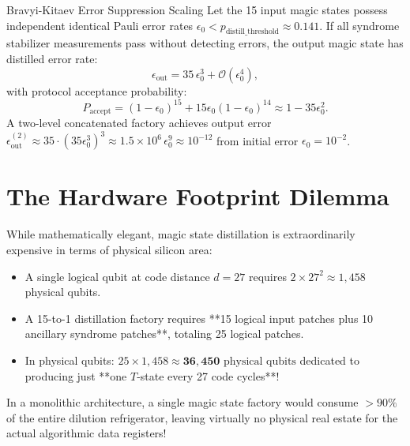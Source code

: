 \begin{theorembox}{Bravyi-Kitaev Error Suppression Scaling}
Let the 15 input magic states possess independent identical Pauli error rates $\epsilon_0 < p_{\text{distill\_threshold}} \approx 0.141$. If all syndrome stabilizer measurements pass without detecting errors, the output magic state has distilled error rate:
\begin{equation}
    \epsilon_{\text{out}} = 35 \, \epsilon_0^3 + \mathcal{O}(\epsilon_0^4),
    \label{eq:bravyi_kitaev_scaling}
\end{equation}
with protocol acceptance probability:
\begin{equation}
    P_{\text{accept}} = (1 - \epsilon_0)^{15} + 15 \epsilon_0 (1 - \epsilon_0)^{14} \approx 1 - 35 \epsilon_0^2.
    \label{eq:distill_paccept}
\end{equation}
A two-level concatenated factory achieves output error $\epsilon_{\text{out}}^{(2)} \approx 35 \cdot (35 \epsilon_0^3)^3 \approx 1.5 \times 10^6 \, \epsilon_0^9 \approx 10^{-12}$ from initial error $\epsilon_0 = 10^{-2}$.
\end{theorembox}

\section{The Hardware Footprint Dilemma}
\label{sec:footprint_dilemma}

While mathematically elegant, magic state distillation is extraordinarily expensive in terms of physical silicon area:
\begin{itemize}
    \item A single logical qubit at code distance $d=27$ requires $2 \times 27^2 \approx 1,458$ physical qubits.
    \item A 15-to-1 distillation factory requires **15 logical input patches plus 10 ancillary syndrome patches**, totaling 25 logical patches.
    \item In physical qubits: $25 \times 1,458 \approx \bm{36,450}\text{ physical qubits}$ dedicated to producing just **one $T$-state every 27 code cycles**!
\end{itemize}

In a monolithic architecture, a single magic state factory would consume $>90\%$ of the entire dilution refrigerator, leaving virtually no physical real estate for the actual algorithmic data registers!

